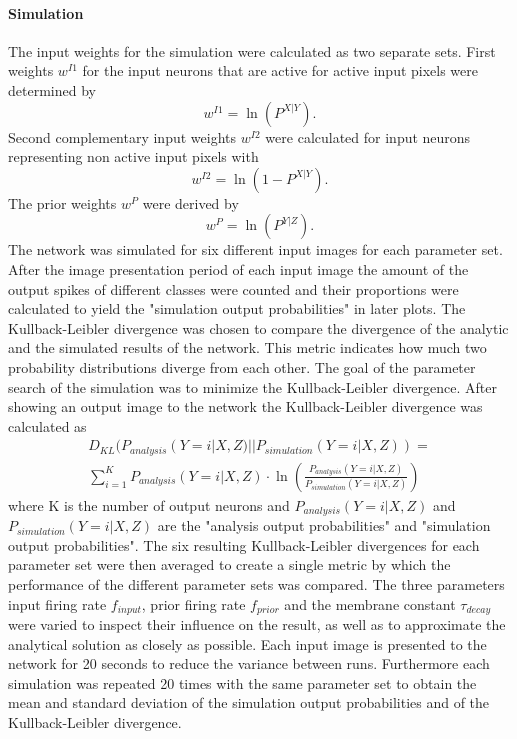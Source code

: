 \paragraph{Simulation}
The input weights for the simulation were calculated as two separate sets. First weights $w^{I1}$ for the input neurons that are active for active input pixels were determined by 
\begin{equation}
\label{eqn:1DWeights}
w^{I1} = \ln(P^{X|Y}).
\end{equation}
Second complementary input weights $w^{I2}$ were calculated for  input neurons representing non active input pixels with
\begin{equation}
\label{eqn:1DWeightsComplementary}
w^{I2} = \ln(1 - P^{X|Y}).
\end{equation} 
The prior weights $w^P$ were derived by 
\begin{equation}
\label{eqn:1DWeightsPrior}
w^P = \ln(P^{Y|Z}).
\end{equation}
The network was simulated for six different input images for each parameter set. After the image presentation period of each input image the amount of the output spikes of different classes were counted and their proportions were calculated to yield the "simulation output probabilities" in later plots. The Kullback-Leibler divergence was chosen to compare the divergence of the analytic and the simulated results of the network. This metric indicates how much two probability distributions diverge from each other. The goal of the parameter search of the simulation was to minimize the Kullback-Leibler divergence. After showing an output image to the network the Kullback-Leibler divergence was calculated as
\begin{equation}
\begin{split}
\label{eqn:KLDivergence}
D_{KL}(P_{analysis}(Y = i|X, Z)||P_{simulation}(Y = i|X, Z)) = \\ \sum_{i=1}^K P_{analysis}(Y = i|X, Z) \cdot \ln( \frac{P_{analysis}(Y = i|X, Z)}{P_{simulation}(Y = i|X, Z)})
\end{split}
\end{equation}
where K is the number of output neurons and $P_{analysis}(Y = i|X, Z)$ and $P_{simulation}(Y = i|X, Z)$ are the "analysis output probabilities" and "simulation output probabilities". The six resulting Kullback-Leibler divergences for each parameter set were then averaged to create a single metric by which the performance of the different parameter sets was compared. The three parameters input firing rate $f_{input}$, prior firing rate $f_{prior}$ and the membrane constant $\tau_{decay}$ were varied to inspect their influence on the result, as well as to approximate the analytical solution as closely as possible. Each input image is presented to the network for 20 seconds to reduce the variance between runs. Furthermore each simulation was repeated 20 times with the same parameter set to obtain the mean and standard deviation of the simulation output probabilities and of the Kullback-Leibler divergence.

